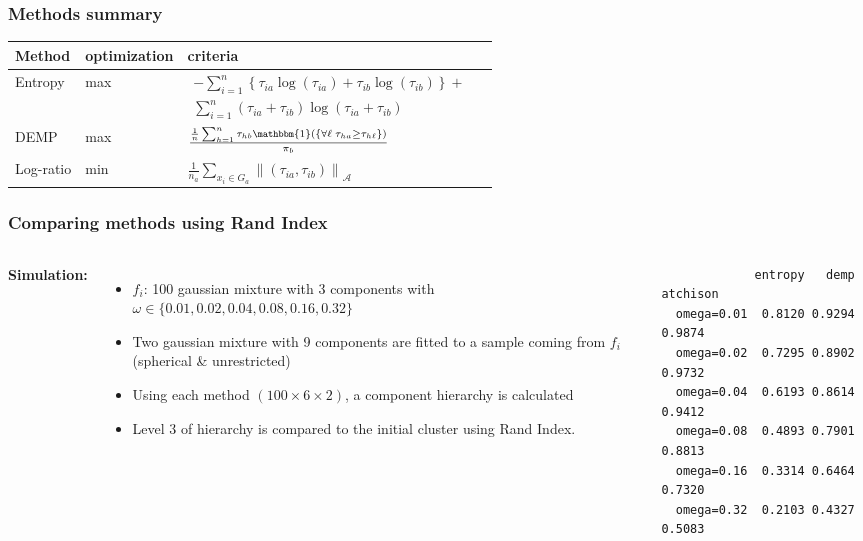\begin{frame}
\frametitle{Methods summary}
\small
\begin{tabular}{ >{\centering}m{0.7in} | >{\centering}m{0.8in} | >{\centering}m{1.3in} m{0in}}
\textbf{Method} & \textbf{optimization} & \textbf{criteria} & \\\hline\hline
Entropy     & max  & 
$\substack{- \sum_{i=1}^n \left\{ \tau_{i a} \log(\tau_{i a}) + \tau_{i b} \log(\tau_{i b})\right\} + \\
\sum_{i=1}^n  (\tau_{i a}+\tau_{i b}) \log(\tau_{i a} + \tau_{i b})}$  & \\ [2em]
\hline
DEMP        & max & $\frac{ \frac{1}{n} \sum_{h=1}^n \tau_{hb} \mathbbm{1}\left( \{ \forall \ell \; \tau_{ha} \geq \tau_{h\ell}  \} \right) }{ \pi_b }$ &\\ [2em]
\hline
Log-ratio   & min & $\frac{1}{n_a} \sum_{x_i \in G_a} \left\| (\tau_{ia}, \tau_{ib}) \right\|_{\mathcal{A}}$ & \\ [2em]
\end{tabular}

\end{frame}

\begin{frame}[fragile]
\frametitle{Comparing methods using Rand Index}
\centering
\begin{columns}[T]

\scriptsize


\textbf{Simulation:}

\begin{itemize}
\item $f_i$: 100 gaussian mixture with $3$ components with $\omega \in \{ 0.01, 0.02, 0.04, 0.08, 0.16, 0.32\}$
\item Two gaussian mixture with 9 components are fitted to a sample coming from $f_i$ (spherical \& unrestricted) 
\item Using each method $(100 \times 6 \times 2)$, a component hierarchy is calculated
\item Level $3$ of hierarchy is compared to the initial cluster using Rand Index.
\end{itemize}
\medskip
\medskip

\pause
\begin{verbatim}
             entropy   demp  atchison
  omega=0.01  0.8120 0.9294    0.9874
  omega=0.02  0.7295 0.8902    0.9732
  omega=0.04  0.6193 0.8614    0.9412
  omega=0.08  0.4893 0.7901    0.8813
  omega=0.16  0.3314 0.6464    0.7320
  omega=0.32  0.2103 0.4327    0.5083
\end{verbatim}

\end{columns}

\end{frame}
